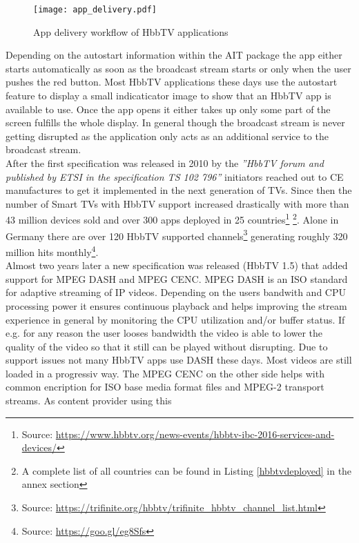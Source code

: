\begin{figure}[htb]
  \centering
  \texttt{[image: app\_delivery.pdf]}\\
  \caption{App delivery workflow of HbbTV applications}\label{fig:app_delivery}
\end{figure}

Depending on the autostart information within the AIT package the app either starts automatically
as soon as the broadcast stream starts or only when the user pushes the red button. Most HbbTV
applications these days use the autostart feature to display a small indicaticator image to
show that an HbbTV app is available to use. Once the app opens it either takes up only some part
of the screen fulfills the whole display. In general though the broadcast stream is never
getting disrupted as the application only acts as an additional service to the broadcast stream.\\
After the first specification was released in 2010 by the \textit{''HbbTV forum and published by ETSI
in the specification TS 102 796''} \cite{evolution} initiators reached out to CE manufactures to get
it implemented in the next generation of TVs. Since then the number of Smart TVs with HbbTV support
increased drastically with more than 43 million devices sold and over 300 apps deployed in 25
countries\footnote{Source: \url{https://www.hbbtv.org/news-events/hbbtv-ibc-2016-services-and-devices/}}
\footnote{A complete list of all countries can be found in Listing \ref{hbbtvdeployed} in the annex section}.
Alone in Germany there are over 120 HbbTV supported channels\footnote{Source: \url{https://trifinite.org/hbbtv/trifinite_hbbtv_channel_list.html}}
generating roughly 320 million hits monthly\footnote{Source: \url{https://goo.gl/eg8Sfs}}.\\
Almost two years later a new specification was released (HbbTV 1.5) that added support for MPEG DASH
and MPEG CENC. MPEG DASH is an ISO standard for adaptive streaming of IP videos. Depending on the
users bandwith and CPU processing power it ensures continuous playback and helps improving the stream
experience in general by monitoring the CPU utilization and/or buffer status. If e.g. for any reason
the user looses bandwidth the video is able to lower the quality of the video so that it still can
be played without disrupting. Due to support issues not many HbbTV apps use DASH these days.
Most videos are still loaded in a progressiv way. The MPEG CENC on the other side helps with common
encription for ISO base media format files and MPEG-2 transport streams. As content provider using this
